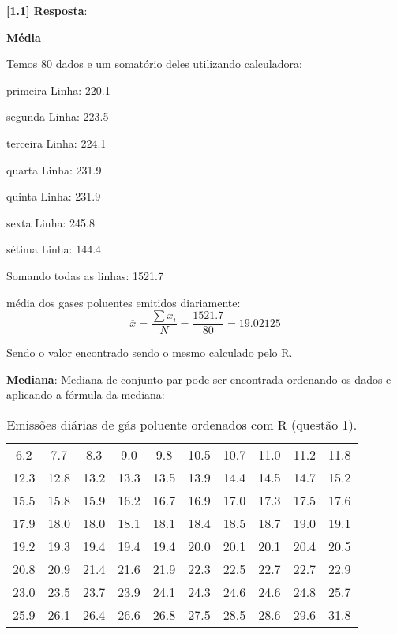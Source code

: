 \documentclass[a4paper,11pt]{article}
\begin{document}
\begin{description}

\item \textbf{[1.1] Resposta}:

\textbf{Média}

Temos 80 dados e um somatório deles utilizando calculadora:
\item primeira Linha: 220.1
\item segunda Linha: 223.5
\item terceira Linha: 224.1
\item quarta Linha: 231.9
\item quinta Linha: 231.9
\item sexta Linha: 245.8
\item sétima Linha: 144.4

Somando todas as linhas: 1521.7

média dos gases poluentes emitidos diariamente: 
\[\overline{x} = \frac{\sum x_i}{N} = \frac{1521.7}{80} = 19.02125\]

Sendo o valor encontrado sendo o mesmo calculado pelo R.

\textbf{Mediana}:
Mediana de conjunto par pode ser encontrada ordenando os dados e aplicando a fórmula da mediana:


\begin{table}[H]
    \centering
    \begin{tabular}{cccccccccc}
        \hline
        6.2 & 7.7 & 8.3 & 9.0 & 9.8 & 10.5 & 10.7 & 11.0 & 11.2 & 11.8 \\
        12.3 & 12.8 & 13.2 & 13.3 & 13.5 & 13.9 & 14.4 & 14.5 & 14.7 & 15.2 \\
        15.5 & 15.8 & 15.9 & 16.2 & 16.7 & 16.9 & 17.0 & 17.3 & 17.5 & 17.6 \\
        17.9 & 18.0 & 18.0 & 18.1 & 18.1 & 18.4 & 18.5 & 18.7 & 19.0 & 19.1 \\
        19.2 & 19.3 & 19.4 & 19.4 & 19.4 & 20.0 & 20.1 & 20.1 & 20.4 & 20.5 \\
        20.8 & 20.9 & 21.4 & 21.6 & 21.9 & 22.3 & 22.5 & 22.7 & 22.7 & 22.9 \\
        23.0 & 23.5 & 23.7 & 23.9 & 24.1 & 24.3 & 24.6 & 24.6 & 24.8 & 25.7 \\
        25.9 & 26.1 & 26.4 & 26.6 & 26.8 & 27.5 & 28.5 & 
        28.6 & 29.6 & 31.8 \\
        \hline
    \end{tabular}
    \caption{Emissões diárias de gás poluente ordenados com R (questão 1).}
    \label{tab:q1}
\end{table}


\end{description}
\end{document}
